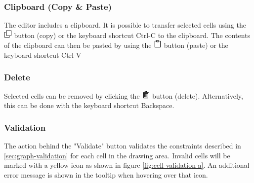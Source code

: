 \documentclass[a4paper,top=25mm,bottom=25mm,12pt,pdftex,halfparskip,twoside,openany,bibtotoc,numbers=noenddot]{scrbook}
\begin{document}
\subsubsection{Clipboard (Copy \& Paste)}

The editor includes a clipboard. It is possible to transfer selected cells using the \includegraphics[height=12pt]{editor-toolbar-clone}
 button (copy) or the keyboard shortcut \textsf{Ctrl-C} to the clipboard.
The contents of the clipboard can then be pasted by using the \includegraphics[height=12pt]{editor-toolbar-clipboard} button (paste) or the keyboard shortcut \textsf{Ctrl-V}

\subsubsection{Delete}

Selected cells can be removed by clicking the \includegraphics[height=12pt]{editor-toolbar-trash} button (delete). Alternatively, this can be done with the keyboard shortcut \textsf{Backspace}.

\subsubsection{Validation}

The action behind the "Validate" button validates the constraints described in \ref{sec:graph-validation} for each cell in the drawing area. Invalid cells will be marked with a yellow icon as shown in figure \ref{fig:cell-validation-a}. An additional error message is shown in the tooltip when hovering over that icon.
\end{document}

